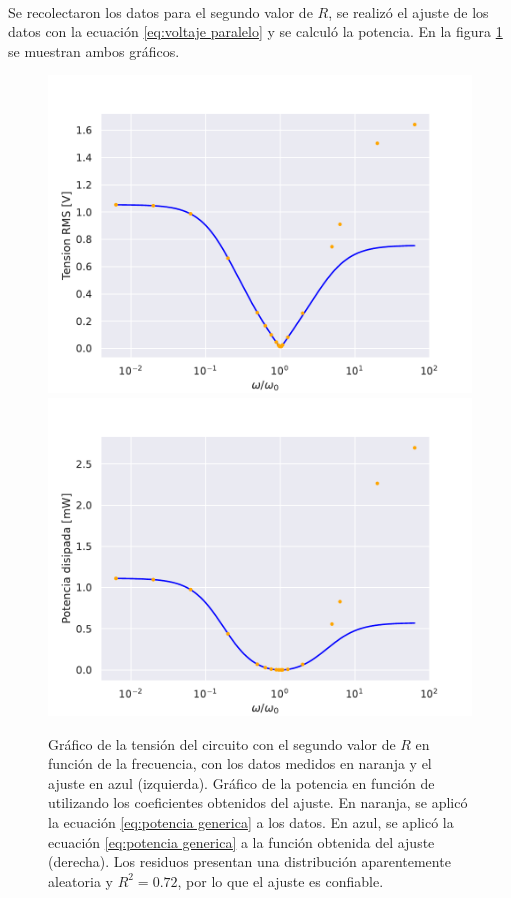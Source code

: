 \paragraph{}
Se recolectaron los datos para el segundo valor de $R$, se realizó el ajuste de los datos con la ecuación \eqref{eq:voltaje paralelo} y se calculó la potencia. En la figura \ref{fig:paralelo potencia2} se muestran ambos gráficos.
\begin{figure} [H]
    \centering
    \includegraphics[scale=0.5]{figuras/RLC-PARALELO-2/tension_bode.pdf}
    \includegraphics[scale=0.5]{figuras/RLC-PARALELO-2/potencia.pdf}
    \caption{Gráfico de la tensión del circuito con el segundo valor de $R$ en función de la frecuencia, con los datos medidos en naranja y el ajuste en azul (izquierda). Gráfico de la potencia  en función de utilizando los coeficientes obtenidos del ajuste. En naranja, se aplicó la ecuación \eqref{eq:potencia generica} a los datos. En azul, se aplicó la ecuación \eqref{eq:potencia generica} a la función obtenida del ajuste (derecha). Los residuos  presentan una distribución aparentemente aleatoria y $R^2= 0.72$, por lo que el ajuste es confiable.}
    \label{fig:paralelo potencia2}
\end{figure}
